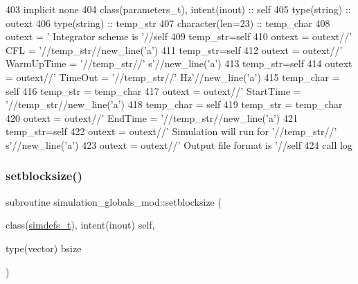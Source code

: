 \begin{DoxyCode}
403     \textcolor{keywordtype}{implicit none}
404     \textcolor{keywordtype}{class}(parameters\_t), \textcolor{keywordtype}{intent(inout)} :: self
405     \textcolor{keywordtype}{type}(string) :: outext
406     \textcolor{keywordtype}{type}(string) :: temp\_str
407     \textcolor{keywordtype}{character(len=23)} :: temp\_char
408     outext = \textcolor{stringliteral}{'      Integrator scheme is '}//self%
409     temp\_str=self%
410     outext = outext//\textcolor{stringliteral}{'       CFL = '}//temp\_str//new\_line(\textcolor{stringliteral}{'a'})
411     temp\_str=self%
412     outext = outext//\textcolor{stringliteral}{'       WarmUpTime = '}//temp\_str//\textcolor{stringliteral}{' s'}//new\_line(\textcolor{stringliteral}{'a'})
413     temp\_str=self%
414     outext = outext//\textcolor{stringliteral}{'       TimeOut = '}//temp\_str//\textcolor{stringliteral}{' Hz'}//new\_line(\textcolor{stringliteral}{'a'})
415     temp\_char = self%
416     temp\_str = temp\_char
417     outext = outext//\textcolor{stringliteral}{'       StartTime = '}//temp\_str//new\_line(\textcolor{stringliteral}{'a'})
418     temp\_char = self%
419     temp\_str = temp\_char
420     outext = outext//\textcolor{stringliteral}{'       EndTime   = '}//temp\_str//new\_line(\textcolor{stringliteral}{'a'})
421     temp\_str=self%
422     outext = outext//\textcolor{stringliteral}{'       Simulation will run for '}//temp\_str//\textcolor{stringliteral}{' s'}//new\_line(\textcolor{stringliteral}{'a'})
423     outext = outext//\textcolor{stringliteral}{'       Output file format is '}//self%
424     \textcolor{keyword}{call }log%
\end{DoxyCode}
\mbox{\label{namespacesimulation__globals__mod_aa65b43534d2d2b6366a4ebc791194805}} 
\subsubsection{\texorpdfstring{setblocksize()}{setblocksize()}}
{\footnotesize\ttfamily subroutine simulation\+\_\+globals\+\_\+mod\+::setblocksize (\begin{DoxyParamCaption}\item[{class(\mbox{\hyperlink{structsimulation__globals__mod_1_1simdefs__t}{simdefs\+\_\+t}}), intent(inout)}]{self,  }\item[{type(vector)}]{bsize }\end{DoxyParamCaption})\hspace{0.3cm}{\ttfamily [private]}}




